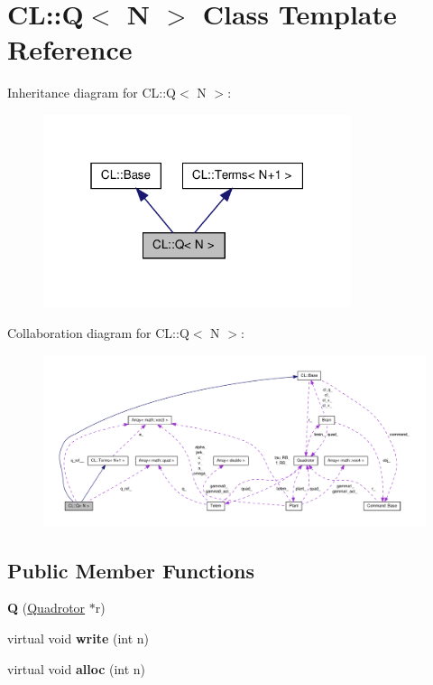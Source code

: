 \hypertarget{classCL_1_1Q}{\section{\-C\-L\-:\-:\-Q$<$ \-N $>$ \-Class \-Template \-Reference}
\label{classCL_1_1Q}
}


\-Inheritance diagram for \-C\-L\-:\-:\-Q$<$ \-N $>$\-:\nopagebreak
\begin{figure}[H]
\begin{center}
\leavevmode
\includegraphics[width=256pt]{classCL_1_1Q__inherit__graph}
\end{center}
\end{figure}


\-Collaboration diagram for \-C\-L\-:\-:\-Q$<$ \-N $>$\-:\nopagebreak
\begin{figure}[H]
\begin{center}
\leavevmode
\includegraphics[width=350pt]{classCL_1_1Q__coll__graph}
\end{center}
\end{figure}
\subsection*{\-Public \-Member \-Functions}
\begin{DoxyCompactItemize}
\item 
\hypertarget{classCL_1_1Q_a557703c167bbb4032c6f5a3776ddd126}{{\bfseries \-Q} (\hyperlink{classQuadrotor}{\-Quadrotor} $\ast$r)}\label{classCL_1_1Q_a557703c167bbb4032c6f5a3776ddd126}

\item 
\hypertarget{classCL_1_1Q_a42ada1340b7ea8c18d4466b765a81c1f}{virtual void {\bfseries write} (int n)}\label{classCL_1_1Q_a42ada1340b7ea8c18d4466b765a81c1f}

\item 
\hypertarget{classCL_1_1Q_aaeb1c2b8db39ba2673f60027cf034cc8}{virtual void {\bfseries alloc} (int n)}\label{classCL_1_1Q_aaeb1c2b8db39ba2673f60027cf034cc8}

\end{DoxyCompactItemize}
